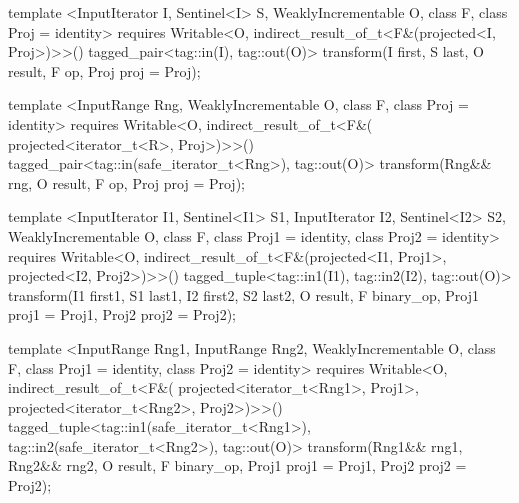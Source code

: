 %
\begin{itemdecl}
template <InputIterator I, Sentinel<I> S, WeaklyIncrementable O, class F, class Proj = identity>
  requires Writable<O, indirect_result_of_t<F&(projected<I, Proj>)>>()
  tagged_pair<tag::in(I), tag::out(O)>
    transform(I first, S last, O result, F op, Proj proj = Proj{});

template <InputRange Rng, WeaklyIncrementable O, class F, class Proj = identity>
  requires Writable<O, indirect_result_of_t<F&(
    projected<iterator_t<R>, Proj>)>>()
  tagged_pair<tag::in(safe_iterator_t<Rng>), tag::out(O)>
    transform(Rng&& rng, O result, F op, Proj proj = Proj{});

template <InputIterator I1, Sentinel<I1> S1, InputIterator I2, Sentinel<I2> S2,
    WeaklyIncrementable O, class F, class Proj1 = identity, class Proj2 = identity>
  requires Writable<O, indirect_result_of_t<F&(projected<I1, Proj1>,
    projected<I2, Proj2>)>>()
  tagged_tuple<tag::in1(I1), tag::in2(I2), tag::out(O)>
    transform(I1 first1, S1 last1, I2 first2, S2 last2, O result,
            F binary_op, Proj1 proj1 = Proj1{}, Proj2 proj2 = Proj2{});

template <InputRange Rng1, InputRange Rng2, WeaklyIncrementable O, class F,
    class Proj1 = identity, class Proj2 = identity>
  requires Writable<O, indirect_result_of_t<F&(
    projected<iterator_t<Rng1>, Proj1>, projected<iterator_t<Rng2>, Proj2>)>>()
  tagged_tuple<tag::in1(safe_iterator_t<Rng1>),
               tag::in2(safe_iterator_t<Rng2>),
               tag::out(O)>
    transform(Rng1&& rng1, Rng2&& rng2, O result,
              F binary_op, Proj1 proj1 = Proj1{}, Proj2 proj2 = Proj2{});
\end{itemdecl}

